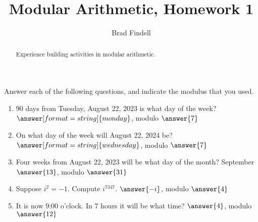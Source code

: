 \documentclass[space,nooutcomes,handout]{ximera}
\title{Modular Arithmetic, Homework 1}
\author{Brad Findell}
\begin{document}
\begin{abstract}
Experience building activities in modular arithmetic.  
\end{abstract}
\maketitle

\begin{problem}
Answer each of the following questions, and indicate the modulus that you used.  
\begin{enumerate}
\item 90 days from Tuesday, August 22, 2023 is what day of the week?  $\answer[format=string]{monday}$, modulo $\answer{7}$
\item On what day of the week will August 22, 2024 be? $\answer[format=string]{wednesday}$, modulo $\answer{7}$
\item Four weeks from August 22, 2023 will be what day of the month? September $\answer{13}$, modulo $\answer{31}$
\item Suppose $i^2 = -1$.  Compute $i^{7347}$. $\answer{-i}$, modulo $\answer{4}$
\item It is now 9:00 o'clock.  In 7 hours it will be what time? $\answer{4}$, modulo $\answer{12}$
\end{enumerate}
\end{problem}
\end{document}
